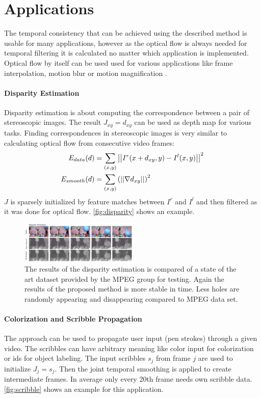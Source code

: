 \documentclass{utue} %
\begin{document}
\section{Applications} \label{applications}
The temporal consistency that can be achieved using the described method is
usable for many applications, however as the optical flow is always needed for
temporal filtering it is calculated no matter which application is implemented.
Optical flow by itself can be used used for various applications like frame
interpolation, motion blur or motion magnification
\cite{journals/tog/LiuTFDA05}.

\paragraph{Disparity Estimation} \label{disparity-estimation}
Disparity estimation is about computing the correspondence between a pair of
stereoscopic images. The result $J_{xy}=d_{xy}$ can be used as depth map for
various tasks. Finding correspondences in stereoscopic images is very similar to
calculating optical flow from consecutive video frames:
\begin{align*}
  E_{data}(d) &= \sum_{(x,y)}\left|\left| I^r(x + d_{xy}, y) - I^l(x,y) \right|\right|^2\\
  E_{smooth}(d) &= \sum_{(x,y)}\left( \left|\left| \nabla d_{xy} \right|\right| \right)^2
\end{align*}
$J$ is sparsely initialized by feature matches between $I^r$ and $I^l$ and then
filtered as it was done for optical flow. \autoref{fig:disparity} shows an
example.
\begin{figure}[htb]
  \centering
  \includegraphics[width=0.5\textwidth]{images/disparity.png}
  \caption{The results of the disparity estimation is compared of a state of the
  art dataset provided by the MPEG group for testing. Again the results of the
proposed method is more stable in time. Less holes are randomly appearing and
disappearing compared to MPEG data set.}
  \label{fig:disparity}
\end{figure}

\paragraph{Colorization and Scribble Propagation} \label{colorization}
The approach can be used to propagate user input (pen strokes) through a given
video. The scribbles can have arbitrary meaning like color input for
colorization or ids for object labeling. The input scribbles $s_j$ from frame
$j$ are used to initialize $J_j = s_j$. Then the joint temporal smoothing is
applied to create intermediate frames. In average only every 20th frame needs
own scribble data.  \autoref{fig:scribble} shows an example for this
application.
\end{document}

